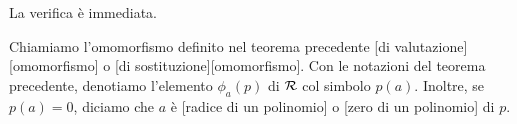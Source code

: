 \Proof La verifica \`e immediata. \EndProof
\begin{Definition}
	Chiamiamo l'omomorfismo definito nel teorema precedente [di valutazione][omomorfismo] o [di sostituzione][omomorfismo]. Con le notazioni del teorema precedente, denotiamo l'elemento $\phi_a(p)$ di $\mathcal{R}$ col simbolo $p(a)$. Inoltre, se $p(a) = 0$, diciamo che $a$ \`e [radice di un polinomio] o [zero di un polinomio] di $p$.
\end{Definition}
